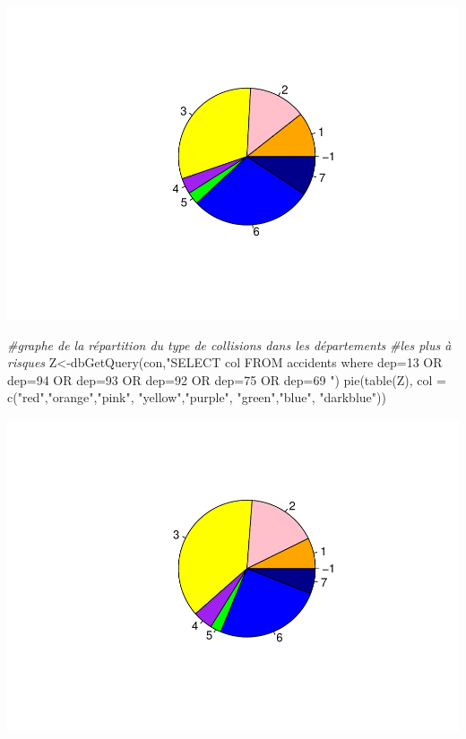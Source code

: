 \documentclass[mstat,12pt]{unswthesis}
\newenvironment{Shaded}{\begin{snugshade}}{\end{snugshade}}
\newcommand{\AttributeTok}[1]{\textcolor[rgb]{0.77,0.63,0.00}{#1}}
\newcommand{\CommentTok}[1]{\textcolor[rgb]{0.56,0.35,0.01}{\textit{#1}}}
\newcommand{\FunctionTok}[1]{\textcolor[rgb]{0.00,0.00,0.00}{#1}}
\newcommand{\NormalTok}[1]{#1}
\newcommand{\OtherTok}[1]{\textcolor[rgb]{0.56,0.35,0.01}{#1}}
\newcommand{\StringTok}[1]{\textcolor[rgb]{0.31,0.60,0.02}{#1}}
\begin{document}
\includegraphics{rapport-G04_files/figure-latex/unnamed-chunk-13-1.pdf}

\begin{Shaded}
\begin{Highlighting}[]
\CommentTok{\#graphe de la répartition du type de collisions dans les départements }
\CommentTok{\#les plus à risques}
\NormalTok{Z}\OtherTok{\textless{}{-}}\FunctionTok{dbGetQuery}\NormalTok{(con,}\StringTok{"SELECT col}
\StringTok{FROM accidents}
\StringTok{where dep=13 OR dep=94 OR dep=93 OR dep=92 OR dep=75 OR dep=69}
\StringTok{"}\NormalTok{)}
\FunctionTok{pie}\NormalTok{(}\FunctionTok{table}\NormalTok{(Z), }\AttributeTok{col =} \FunctionTok{c}\NormalTok{(}\StringTok{"red"}\NormalTok{,}\StringTok{"orange"}\NormalTok{,}\StringTok{"pink"}\NormalTok{, }\StringTok{"yellow"}\NormalTok{,}\StringTok{"purple"}\NormalTok{,}
                      \StringTok{"green"}\NormalTok{,}\StringTok{"blue"}\NormalTok{, }\StringTok{"darkblue"}\NormalTok{))}
\end{Highlighting}
\end{Shaded}

\includegraphics{rapport-G04_files/figure-latex/unnamed-chunk-14-1.pdf}
\end{document}
